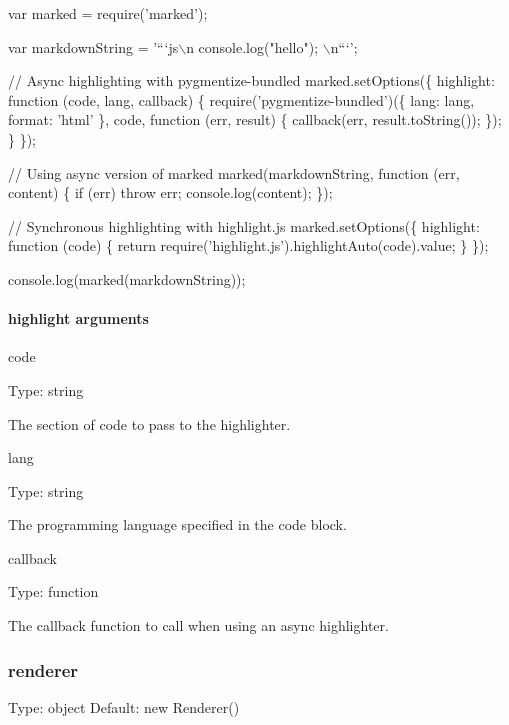 \begin{DoxyCode}
var marked = require(\textcolor{stringliteral}{'marked'});

var markdownString = \textcolor{stringliteral}{'```js\(\backslash\)n console.log("hello"); \(\backslash\)n```'};

\textcolor{comment}{// Async highlighting with pygmentize-bundled}
marked.setOptions(\{
  highlight: \textcolor{keyword}{function} (code, lang, callback) \{
    require(\textcolor{stringliteral}{'pygmentize-bundled'})(\{ lang: lang, format: \textcolor{stringliteral}{'html'} \}, code, \textcolor{keyword}{function} (err, result) \{
      callback(err, result.toString());
    \});
  \}
\});

\textcolor{comment}{// Using async version of marked}
marked(markdownString, \textcolor{keyword}{function} (err, content) \{
  \textcolor{keywordflow}{if} (err) \textcolor{keywordflow}{throw} err;
  console.log(content);
\});

\textcolor{comment}{// Synchronous highlighting with highlight.js}
marked.setOptions(\{
  highlight: \textcolor{keyword}{function} (code) \{
    \textcolor{keywordflow}{return} require(\textcolor{stringliteral}{'highlight.js'}).highlightAuto(code).value;
  \}
\});

console.log(marked(markdownString));
\end{DoxyCode}


\paragraph*{highlight arguments}

{\ttfamily code}

Type\+: {\ttfamily string}

The section of code to pass to the highlighter.

{\ttfamily lang}

Type\+: {\ttfamily string}

The programming language specified in the code block.

{\ttfamily callback}

Type\+: {\ttfamily function}

The callback function to call when using an async highlighter.

\subsubsection*{renderer}

Type\+: {\ttfamily object} Default\+: {\ttfamily new Renderer()}

